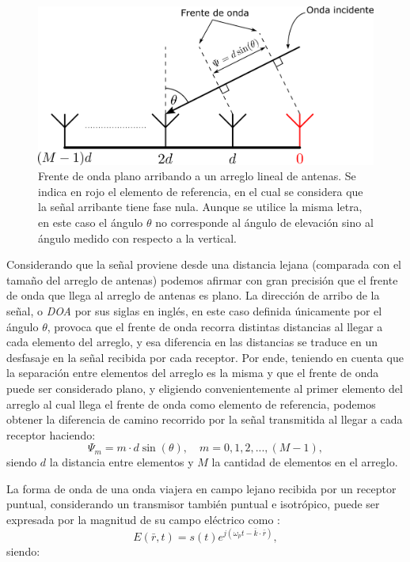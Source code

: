 \begin{figure}[ht!]
    \centering
    \includegraphics[width=0.8\linewidth]{images/02-Beamforming/caso1d.png}
    \caption{Frente de onda plano arribando a un arreglo lineal de antenas. Se indica en rojo el elemento de referencia, en el cual se considera que la señal arribante tiene fase nula. Aunque se utilice la misma letra, en este caso el ángulo $\theta$ no corresponde al ángulo de elevación sino al ángulo medido con respecto a la vertical.}
    \label{fig:beamforming_caso1d}
\end{figure}

Considerando que la señal proviene desde una distancia lejana (comparada con el tamaño del arreglo de antenas) podemos afirmar con gran precisión que el frente de onda que llega al arreglo de antenas es plano. La dirección de arribo de la señal, o \emph{DOA} por sus siglas en inglés, en este caso definida únicamente por el ángulo $\theta$, provoca que el frente de onda recorra distintas distancias al llegar a cada elemento del arreglo, y esa diferencia en las distancias se traduce en un desfasaje en la señal recibida por cada receptor. Por ende, teniendo en cuenta que la separación entre elementos del arreglo es la misma y que el frente de onda puede ser considerado plano, y eligiendo convenientemente al primer elemento del arreglo al cual llega el frente de onda como elemento de referencia, podemos obtener la diferencia de camino recorrido por la señal transmitida al llegar a cada receptor haciendo:
\begin{equation}
    \Psi_m = m\cdot d\sin(\theta),\quad m=0,1,2,...,(M-1),
\end{equation}
siendo $d$ la distancia entre elementos y $M$ la cantidad de elementos en el arreglo.

La forma de onda de una onda viajera en campo lejano recibida por un receptor puntual, considerando un transmisor también puntual e isotrópico, puede ser expresada por la magnitud de su campo eléctrico como \cite{bib:2decadesbeamforming}:
\begin{equation}
    E(\bar{r},t)=s(t)e^{j(\omega_p t - \bar{k}\cdot\bar{r})},
\end{equation}
siendo:

